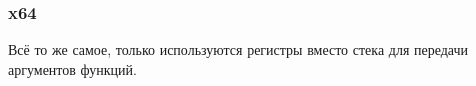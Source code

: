 \subsubsection{x64}

Всё то же самое, только используются регистры вместо стека для передачи аргументов функций.






